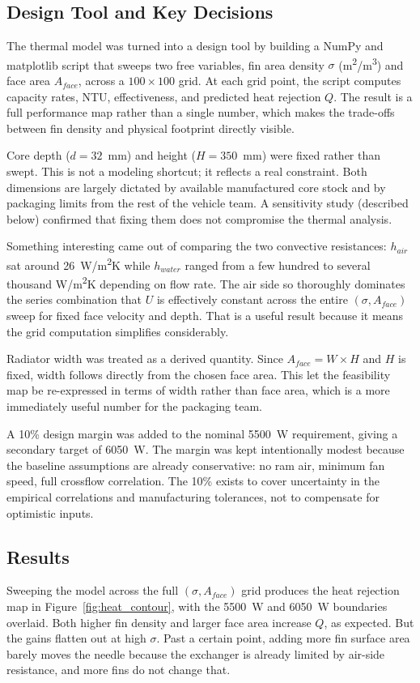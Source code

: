 \documentclass[12pt, a4paper]{article}
\begin{document}
\subsection{Design Tool and Key Decisions}
The thermal model was turned into a design tool by building a NumPy and matplotlib script that sweeps two free variables, fin area density $\sigma$ (m\textsuperscript{2}/m\textsuperscript{3}) and face area $A_{face}$, across a $100 \times 100$ grid. At each grid point, the script computes capacity rates, NTU, effectiveness, and predicted heat rejection $Q$. The result is a full performance map rather than a single number, which makes the trade-offs between fin density and physical footprint directly visible.

Core depth ($d = 32$~mm) and height ($H = 350$~mm) were fixed rather than swept. This is not a modeling shortcut; it reflects a real constraint. Both dimensions are largely dictated by available manufactured core stock and by packaging limits from the rest of the vehicle team. A sensitivity study (described below) confirmed that fixing them does not compromise the thermal analysis.

Something interesting came out of comparing the two convective resistances: $h_{air}$ sat around 26~W/m\textsuperscript{2}K while $h_{water}$ ranged from a few hundred to several thousand W/m\textsuperscript{2}K depending on flow rate. The air side so thoroughly dominates the series combination that $U$ is effectively constant across the entire $(\sigma, A_{face})$ sweep for fixed face velocity and depth. That is a useful result because it means the grid computation simplifies considerably.

Radiator width was treated as a derived quantity. Since $A_{face} = W \times H$ and $H$ is fixed, width follows directly from the chosen face area. This let the feasibility map be re-expressed in terms of width rather than face area, which is a more immediately useful number for the packaging team.

A 10\% design margin was added to the nominal 5500~W requirement, giving a secondary target of 6050~W. The margin was kept intentionally modest because the baseline assumptions are already conservative: no ram air, minimum fan speed, full crossflow correlation. The 10\% exists to cover uncertainty in the empirical correlations and manufacturing tolerances, not to compensate for optimistic inputs.

\subsection{Results}
Sweeping the model across the full $(\sigma, A_{face})$ grid produces the heat rejection map in Figure~\ref{fig:heat_contour}, with the 5500~W and 6050~W boundaries overlaid. Both higher fin density and larger face area increase $Q$, as expected. But the gains flatten out at high $\sigma$. Past a certain point, adding more fin surface area barely moves the needle because the exchanger is already limited by air-side resistance, and more fins do not change that.
\end{document}
